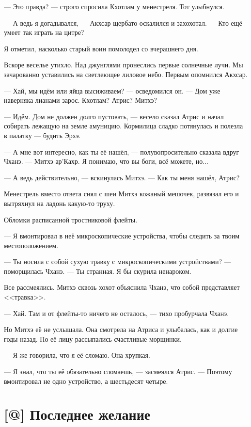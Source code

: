 --- Это правда? --- строго спросила Кхотлам у менестреля.
Тот улыбнулся.

--- А ведь я догадывался, --- Акхсар щербато оскалился и захохотал.
--- Кто ещё умеет так играть на цитре?

Я отметил, насколько старый воин помолодел со вчерашнего дня.

Вскоре веселье утихло.
Над джунглями пронеслись первые солнечные лучи.
Мы зачарованно уставились на светлеющее лиловое небо.
Первым опомнился Акхсар.

--- Хай, мы идём или яйца высиживаем? --- осведомился он.
--- Дом уже наверняка лианами зарос.
Кхотлам?
Атрис?
Митхэ?

--- Идём.
Дом не должен долго пустовать, --- весело сказал Атрис и начал собирать лежащую на земле амуницию.
Кормилица сладко потянулась и полезла в палатку --- будить Эрхэ.

--- А мне вот интересно, как ты её нашёл, --- полувопросительно сказала вдруг Чханэ.
--- Митхэ ар’Кахр.
Я понимаю, что вы боги, всё можете, но...

--- А ведь действительно, --- вскинулась Митхэ.
--- Как ты меня нашёл, Атрис?

Менестрель вместо ответа снял с шеи Митхэ кожаный мешочек, развязал его и вытряхнул на ладонь какую-то труху.

Обломки расписанной тростниковой флейты.

--- Я вмонтировал в неё микроскопические устройства, чтобы следить за твоим местоположением.

--- Ты носила с собой сухую травку с микроскопическими устройствами? --- поморщилась Чханэ.
--- Ты странная.
Я бы скурила ненароком.

Все рассмеялись.
Митхэ сквозь хохот объяснила Чханэ, что собой представляет <<травка>>.

--- Хай.
Там и от флейты-то ничего не осталось, --- тихо пробурчала Чханэ.

Но Митхэ её не услышала.
Она смотрела на Атриса и улыбалась, как и долгие годы назад.
По её лицу рассыпались счастливые морщинки.

--- Я же говорила, что я её сломаю.
Она хрупкая.

--- Я знал, что ты её обязательно сломаешь, --- засмеялся Атрис.
--- Поэтому вмонтировал не одно устройство, а шестьдесят четыре.

\section{[@] Последнее желание}

